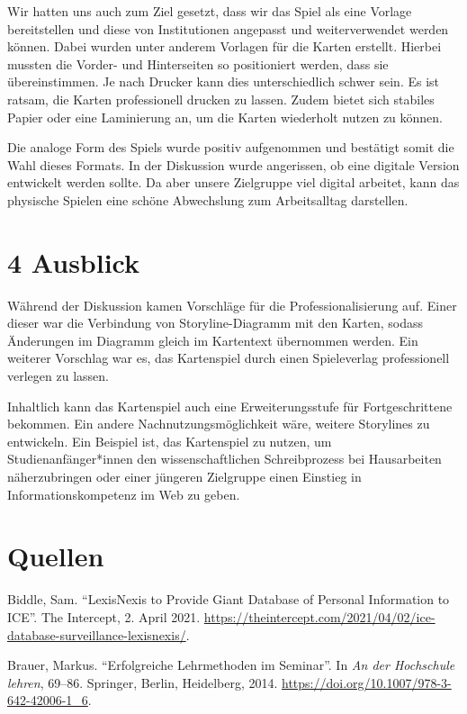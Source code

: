 \documentclass[a4paper,
fontsize=11pt,
oneside,
numbers=noperiodatend,
parskip=half-,
bibliography=totoc,
final
]{scrartcl}
\begin{document}
Wir hatten uns auch zum Ziel gesetzt, dass wir das Spiel als eine
Vorlage bereitstellen und diese von Institutionen angepasst und
weiterverwendet werden können. Dabei wurden unter anderem Vorlagen für
die Karten erstellt. Hierbei mussten die Vorder- und Hinterseiten so
positioniert werden, dass sie übereinstimmen. Je nach Drucker kann dies
unterschiedlich schwer sein. Es ist ratsam, die Karten professionell
drucken zu lassen. Zudem bietet sich stabiles Papier oder eine
Laminierung an, um die Karten wiederholt nutzen zu können.

Die analoge Form des Spiels wurde positiv aufgenommen und bestätigt
somit die Wahl dieses Formats. In der Diskussion wurde angerissen, ob
eine digitale Version entwickelt werden sollte. Da aber unsere
Zielgruppe viel digital arbeitet, kann das physische Spielen eine schöne
Abwechslung zum Arbeitsalltag darstellen.

\section{4 Ausblick}\label{ausblick}

Während der Diskussion kamen Vorschläge für die Professionalisierung
auf. Einer dieser war die Verbindung von Storyline-Diagramm mit den
Karten, sodass Änderungen im Diagramm gleich im Kartentext übernommen
werden. Ein weiterer Vorschlag war es, das Kartenspiel durch einen
Spieleverlag professionell verlegen zu lassen.

Inhaltlich kann das Kartenspiel auch eine Erweiterungsstufe für
Fortgeschrittene bekommen. Ein andere Nachnutzungsmöglichkeit wäre,
weitere Storylines zu entwickeln. Ein Beispiel ist, das Kartenspiel zu
nutzen, um Studienanfänger*innen den wissenschaftlichen Schreibprozess
bei Hausarbeiten näherzubringen oder einer jüngeren Zielgruppe einen
Einstieg in Informationskompetenz im Web zu geben.

\section{Quellen}\label{quellen}

Biddle, Sam. \enquote{LexisNexis to Provide Giant Database of Personal
Information to ICE}. The Intercept, 2. April 2021.
\url{https://theintercept.com/2021/04/02/ice-database-surveillance-lexisnexis/}.

Brauer, Markus. \enquote{Erfolgreiche Lehrmethoden im Seminar}. In
\emph{An der Hochschule lehren}, 69--86. Springer, Berlin, Heidelberg,
2014. \url{https://doi.org/10.1007/978-3-642-42006-1_6}.
\end{document}

